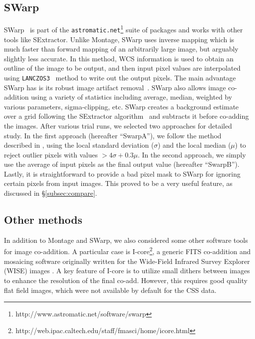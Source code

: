 \documentclass[fleqn,usenatbib]{mnras}
\begin{document}
\subsection{SWarp}
SWarp~\citep{Bertin1996,swarp} is part of the \texttt{astromatic.net}\footnote{http://www.astromatic.net/software/swarp} suite of packages and works with other tools like SExtractor. 
Unlike Montage, SWarp uses inverse mapping which is much faster than forward mapping of an arbitrarily large image, but arguably slightly less accurate. 
In this method, WCS information is used to obtain an outline of the image to be output, and then input pixel values are interpolated using \texttt{LANCZOS3}~\citep{swarp} method to write out the output pixels.
 The main advantage SWarp has is its robust image artifact removal~\citep{clip}. SWarp also allows image co-addition using a  variety of statistics including average, median, weighted by various parameters, sigma-clipping, etc. SWarp creates a background estimate over a grid following the SExtractor algorithm~\citep{Bertin1996} and subtracts it before co-adding the images. After various trial runs, we selected two approaches for detailed study. In the first approach (hereafter ``SwarpA''), we follow the method described in \citet{clip}, using the local standard deviation ($\sigma$) and the local median ($\mu$) to reject outlier pixels with values $>4\sigma + 0.3\mu$. In the second approach, we simply use the average of input pixels as the final output value (hereafter ``SwarpB''). Lastly, it is straightforward to provide a bad pixel mask to SWarp for ignoring certain pixels from input images. This proved to be a very useful feature, as discussed in \S\ref{subsec:compare}.

\subsection{Other methods}
In addition to Montage and SWarp, we also considered some other software tools for image co-addition. A particular case is I-core\footnote{http://web.ipac.caltech.edu/staff/fmasci/home/icore.html}, a generic FITS co-addition and mosaicing software originally written for the Wide-Field
Infrared Survey Explorer (WISE) images \citep{icoreref,icoreref2}. A key feature of I-core is to utilize small dithers between images to enhance the resolution of the final co-add. However, this requires good quality flat field images, which were not available by default for the CSS data. 
\end{document}
